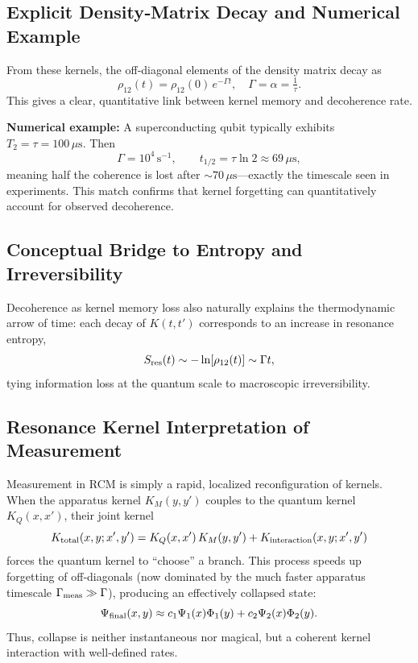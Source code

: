 \subsection{Explicit Density‐Matrix Decay and Numerical Example}

From these kernels, the off‐diagonal elements of the density matrix decay as
\begin{equation}\label{eq:rho_decay}
\rho_{12}(t) = \rho_{12}(0)\,e^{-\Gamma t},\quad \Gamma = \alpha = \tfrac{1}{\tau}.
\end{equation}
This gives a clear, quantitative link between kernel memory and decoherence rate.

\medskip

\noindent\textbf{Numerical example:}  A superconducting qubit typically exhibits $T_2=\tau=100\,\mu\mathrm{s}$.  Then
\[
\Gamma = 10^4\,\mathrm{s^{-1}},\qquad
t_{1/2} = \tau\ln2 \approx 69\,\mu\mathrm{s},
\]
meaning half the coherence is lost after $\sim70\,\mu\mathrm{s}$—exactly the timescale seen in experiments.  This match confirms that kernel forgetting can quantitatively account for observed decoherence.

\subsection{Conceptual Bridge to Entropy and Irreversibility}

Decoherence as kernel memory loss also naturally explains the thermodynamic arrow of time: each decay of $K(t,t')$ corresponds to an increase in resonance entropy,
\[
S_{\rm res}(t)\sim -\ln[\rho_{12}(t)] \sim \Gamma t,
\]
tying information loss at the quantum scale to macroscopic irreversibility.

\subsection{Resonance Kernel Interpretation of Measurement}

Measurement in RCM is simply a rapid, localized reconfiguration of kernels.  When the apparatus kernel $K_M(y,y')$ couples to the quantum kernel $K_Q(x,x')$, their joint kernel
\[
K_{\rm total}(x,y;x',y')
=K_Q(x,x')\,K_M(y,y')
+K_{\rm interaction}(x,y;x',y')
\]
forces the quantum kernel to “choose” a branch.  This process speeds up forgetting of off‐diagonals (now dominated by the much faster apparatus timescale $\Gamma_{\rm meas}\gg\Gamma$), producing an effectively collapsed state:
\[
\Psi_{\rm final}(x,y)\approx c_1\Psi_1(x)\Phi_1(y)+c_2\Psi_2(x)\Phi_2(y).
\]
Thus, collapse is neither instantaneous nor magical, but a coherent kernel interaction with well‐defined rates.

